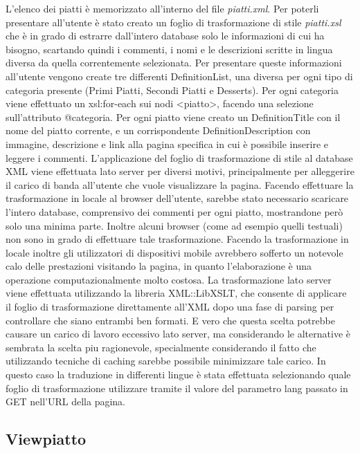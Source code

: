 \documentclass[10pt,a4paper,onecolumn]{article}
\begin{document}
L’elenco dei piatti è memorizzato all’interno del file \textit{piatti.xml}. Per poterli presentare all’utente è stato creato un foglio di trasformazione di stile \textit{piatti.xsl} che è in grado di estrarre dall’intero database solo le informazioni di cui ha bisogno, scartando quindi i commenti, i nomi e le descrizioni scritte in lingua diversa da quella correntemente selezionata.
Per presentare queste informazioni all’utente vengono create tre differenti DefinitionList, una diversa per ogni tipo di categoria presente (Primi Piatti, Secondi Piatti e Desserts).
Per ogni categoria viene effettuato un xsl:for-each sui nodi <piatto>, facendo una selezione sull’attributo @categoria. Per ogni piatto viene creato un DefinitionTitle con il nome del piatto corrente, e un corrispondente DefinitionDescription con immagine, descrizione e link alla pagina specifica in cui è possibile inserire e leggere i commenti.
L’applicazione del foglio di trasformazione di stile al database XML viene effettuata lato server per diversi motivi, principalmente per alleggerire il carico di banda all’utente che vuole visualizzare la pagina. Facendo effettuare la trasformazione in locale al browser dell’utente, sarebbe stato necessario scaricare l’intero database, comprensivo dei commenti per ogni piatto, mostrandone però solo una minima parte. Inoltre alcuni browser (come ad esempio quelli testuali) non sono in grado di effettuare tale trasformazione. Facendo la trasformazione in locale inoltre gli utilizzatori di dispositivi mobile avrebbero sofferto un notevole calo delle prestazioni visitando la pagina, in quanto l’elaborazione è una operazione computazionalmente molto costosa.
La trasformazione lato server viene effettuata utilizzando la libreria XML::LibXSLT, che consente di applicare il foglio di trasformazione direttamente all’XML dopo una fase di parsing per controllare che siano entrambi ben formati.
E vero che questa scelta potrebbe causare un carico di lavoro eccessivo lato server, ma considerando le alternative è sembrata la scelta piu ragionevole, specialmente considerando il fatto che utilizzando tecniche di caching sarebbe possibile minimizzare tale carico.
In questo caso la traduzione in differenti lingue è stata effettuata selezionando quale foglio di trasformazione utilizzare tramite il valore del parametro lang passato in GET nell’URL della pagina.

\subsection{Viewpiatto}
\end{document}
